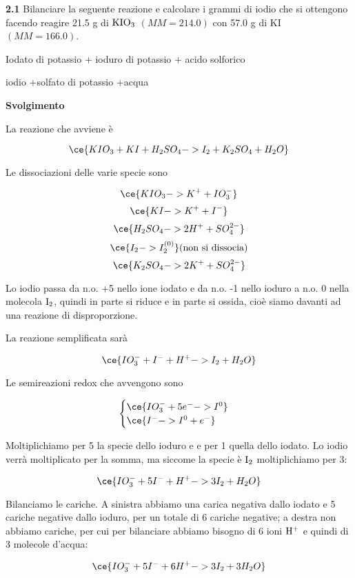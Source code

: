 \vspace{0.2cm}\textbf{2.1} Bilanciare la  seguente reazione e calcolare i grammi di iodio che si ottengono facendo reagire 21.5 g di $\rm KIO_3$ $(MM=214.0)$ con 57.0 g di KI $(MM=166.0)$.

\vspace{0.2cm}
\begin{center}Iodato di potassio + ioduro di potassio + acido solforico \ce{->}

\ce{->}iodio +solfato di potassio +acqua
\end{center}

\large\textbf{Svolgimento}\normalsize

\vspace{0.2cm}La reazione che avviene è

$$\ce{KIO_3 + KI + H_2SO_4 -> I_2 + K_2SO_4 + H_2O}$$

Le dissociazioni delle varie specie sono

$$\ce{KIO_3 -> K^+ + IO_3^-}$$
$$\ce{KI -> K^+ + I^-}$$
$$\ce{H_2SO_4 -> 2H^+ + SO_4^{2-}}$$
$$\ce{I_2 -> I_2^{(0)}}\text{(non si dissocia)}$$
$$\ce{K_2SO_4 -> 2K^+ + SO_4^{2-}}$$

Lo iodio passa da n.o. +5 nello ione iodato e da n.o. -1 nello ioduro a n.o. 0 nella molecola $\rm I_2$, quindi in parte si riduce e in parte si ossida, cioè siamo davanti ad una reazione di disproporzione.

La reazione semplificata sarà

$$\ce{IO_3^- + I^- + H^+ -> I_2 + H_2O}$$

Le semireazioni redox che avvengono sono 

$$\begin{cases}
    \ce{IO_3^- + 5e^-  -> I^0}\\
    \ce{I^- -> I^0 + e^-}
\end{cases}$$

Moltiplichiamo per 5 la specie dello ioduro e e per 1 quella dello iodato. Lo iodio verrà moltiplicato per la somma, ma siccome la specie è $\rm I_2$ moltiplichiamo per 3:

$$\ce{IO_3^- + 5I^- + H^+ -> 3I_2 + H_2O}$$

Bilanciamo le cariche. A sinistra abbiamo una carica negativa dallo iodato e 5 cariche negative dallo ioduro, per un totale di 6 cariche negative; a destra non abbiamo cariche, per cui per bilanciare abbiamo bisogno di 6 ioni $\rm H^+$ e quindi di 3 molecole d'acqua:

$$\ce{IO_3^- + 5I^- + 6H^+ -> 3I_2 + 3H_2O}$$

